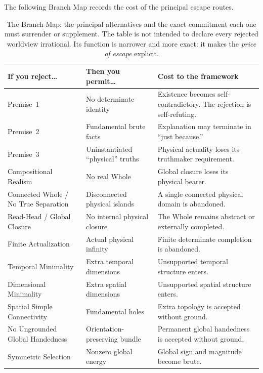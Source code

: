 \documentclass[11pt]{article}
\theoremstyle{canonstyle}
\begin{document}
The following Branch Map records the cost of the principal escape routes.

\begin{table}[h]
\centering
\small
\begin{tabularx}{\textwidth}{@{}>{\raggedright\arraybackslash}p{4.2cm} >{\raggedright\arraybackslash}p{5.2cm} X@{}}
\toprule
\textbf{If you reject\ldots} & \textbf{Then you permit\ldots} & \textbf{Cost to the framework} \\
\midrule
Premise~1 & No determinate identity & Existence becomes self-contradictory. The rejection is self-refuting. \\
Premise~2 & Fundamental brute facts & Explanation may terminate in ``just because.'' \\
Premise~3 & Uninstantiated ``physical'' truths & Physical actuality loses its truthmaker requirement. \\
Compositional Realism & No real Whole & Global closure loses its physical bearer. \\
Connected Whole / No True Separation & Disconnected physical islands & A single connected physical domain is abandoned. \\
Read-Head / Global Closure & No internal physical closure & The Whole remains abstract or externally completed. \\
Finite Actualization & Actual physical infinity & Finite determinate completion is abandoned. \\
Temporal Minimality & Extra temporal dimensions & Unsupported temporal structure enters. \\
Dimensional Minimality & Extra spatial dimensions & Unsupported spatial structure enters. \\
Spatial Simple Connectivity & Fundamental holes & Extra topology is accepted without ground. \\
No Ungrounded Global Handedness & Orientation-preserving bundle & Permanent global handedness is accepted without ground. \\
Symmetric Selection & Nonzero global energy & Global sign and magnitude become brute. \\
\bottomrule
\end{tabularx}
\caption{The Branch Map: the principal alternatives and the exact commitment each one must surrender or supplement. The table is not intended to declare every rejected worldview irrational. Its function is narrower and more exact: it makes the \emph{price of escape} explicit.}
\label{tab:branchmap}
\end{table}
\end{document}
